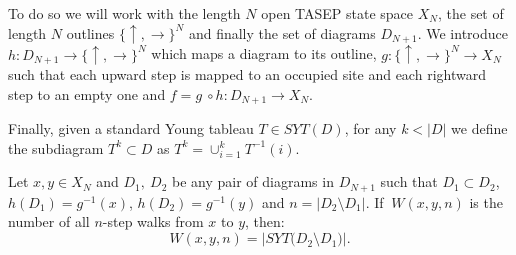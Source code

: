 \documentclass{article}
\begin{document}
To do so we will work with the length $N$ open TASEP state space $X_N$, the set of length $N$ outlines $\{\uparrow,\to\}^N$ and finally the set of diagrams $D_{N+1}$. We introduce $h\colon D_{N+1}\to\{\uparrow,\to\}^N$ which maps a diagram to its outline, $g\colon \{\uparrow,\to\}^N\to X_N$ such that each upward step is mapped to an occupied site and each rightward step to an  empty one and $f=g \ \circ h\colon D_{N+1}\to X_N$.

Finally, given a standard Young tableau $T\in SYT(D)$, for any $k<|D|$ we define the subdiagram $T^k\subset D$ as $T^k=\cup_{i=1}^k T^{-1}(i)$.

\begin{theorem}
    Let $x,y\in X_N$ and $D_1, \ D_2$ be any pair of diagrams in $ D_{N+1}$ such that $D_1\subset D_2$, $h(D_1)=g^{-1}(x)$, $h(D_2)=g^{-1}(y)$ and $n=\left|D_2\setminus D_1\right|$. 
    If $\ W(x,y,n)$ is the 
    number of all $n$-step walks from $x$ to $y$, then:
    \[
    W(x,y,n)=|{SYT(D_2\setminus D_1})|.
    \]
     
\end{theorem}
\end{document}
